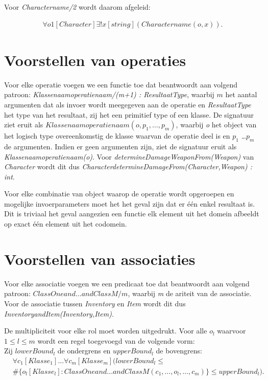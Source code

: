 Voor \textit{Charactername/2} wordt daarom afgeleid:
	
\begin{align*}
	\forall{o1}[Character]\exists!{x}[string](Charactername(o,x)).
\end{align*}

\section{Voorstellen van operaties}
Voor elke operatie voegen we een functie toe dat beantwoordt aan volgend patroon: \sloppy
	 \textit{Klassenaamoperatienaam/(m+1) : ResultaatType}, waarbij $m$ het aantal argumenten dat als invoer wordt meegegeven aan de operatie en \textit{ResultaatType} het type van het resultaat, zij het een primitief type of een klasse. De signatuur ziet eruit als \textit{$Klassenaamoperatienaam(o,p_1,\ldots,p_m)$}, waarbij \textit{o} het object van het logisch type overeenkomstig de klasse waarvan de operatie deel is en \textit{$p_1$} \ldots \textit{$p_m$} de argumenten. Indien er geen argumenten zijn, ziet de signatuur eruit als \textit{Klassenaamoperatienaam(o)}. Voor \textit{determineDamageWeaponFrom(Weapon)} van \textit{Character} wordt dit dus \textit{CharacterdetermineDamageFrom(Character,Weapon) : int}.

Voor elke combinatie van object waarop de operatie wordt opgeroepen en mogelijke invoerparameters moet het het geval zijn dat er \'e\'en enkel resultaat is. Dit is triviaal het geval aangezien een functie elk element uit het domein afbeeldt op exact \'e\'en element uit het codomein.

\section{Voorstellen van associaties}
Voor elke associatie voegen we een predicaat toe dat beantwoordt aan volgend patroon: \textit{$ClassOneand\ldots{}andClassM/m$}, waarbij \textit{m} de ariteit van de associatie. Voor de associatie tussen \textit{Inventory} en \textit{Item} wordt dit dus \textit{InventoryandItem(Inventory,Item)}.

De multipliciteit voor elke rol moet worden uitgedrukt. Voor alle $o_l$ waarvoor $1 \leq l \leq m$ wordt een regel toegevoegd van de volgende vorm:\\

Zij $lowerBound_l$ de ondergrens en $upperBound_l$ de bovengrens:
\begin{align*}
	&\forall{c_1}[Klasse_1]\ldots\forall{c_m}[Klasse_m](lowerBound_l \leq
	\\
	&\#\{o_l[Klasse_l] : ClassOneand\ldots{}andClassM(c_1,\ldots,o_l,\ldots,c_m)\} \leq upperBound_l).
\end{align*}
	
